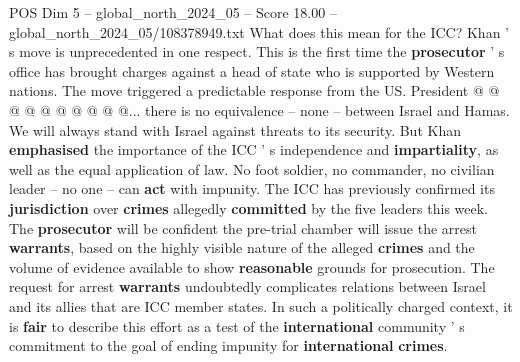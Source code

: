 \begin{textsample}{POS Dim 5 – global\_north\_2024\_05 – Score 18.00 – global\_north\_2024\_05/108378949.txt}
What does this mean for the ICC?
Khan ' s move is unprecedented in one respect.
This is the first time the \textbf{prosecutor} ' s office has brought charges against a head of state who is supported by Western nations.
The move triggered a predictable response from the US.
President @ @ @ @ @ @ @ @ @ @... there is no equivalence -- none -- between Israel and Hamas.
We will always stand with Israel against threats to its security.
But Khan \textbf{emphasised} the importance of the ICC ' s independence and \textbf{impartiality}, as well as the equal application of law.
No foot soldier, no commander, no civilian leader -- no one -- can \textbf{act} with impunity.
The ICC has previously confirmed its \textbf{jurisdiction} over \textbf{crimes} allegedly \textbf{committed} by the five leaders this week.
The \textbf{prosecutor} will be confident the pre-trial chamber will issue the arrest \textbf{warrants}, based on the highly visible nature of the alleged \textbf{crimes} and the volume of evidence available to show \textbf{reasonable} grounds for prosecution.
The request for arrest \textbf{warrants} undoubtedly complicates relations between Israel and its allies that are ICC member states.
In such a politically charged context, it is \textbf{fair} to describe this effort as a test of the \textbf{international} community ' s commitment to the goal of ending impunity for \textbf{international} \textbf{crimes}.

\end{textsample}
